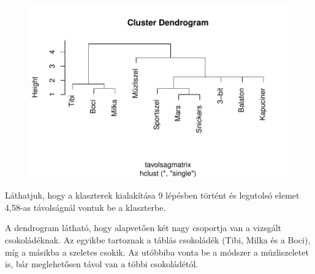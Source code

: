 \documentclass[
  letterpaper,
]{krantz}
\makeatletter
\newenvironment{Shaded}{\begin{snugshade}}{\end{snugshade}}
\newcommand{\CommentTok}[1]{\textcolor[rgb]{0.37,0.37,0.37}{#1}}
\newcommand{\NormalTok}[1]{\textcolor[rgb]{0.00,0.23,0.31}{#1}}
\newcommand{\SpecialCharTok}[1]{\textcolor[rgb]{0.37,0.37,0.37}{#1}}
\newenvironment{kframe}{%
\medskip{}
\setlength{\fboxsep}{.8em}
 \def\at@end@of@kframe{}%
 \ifinner\ifhmode%
  \def\at@end@of@kframe{\end{minipage}}%
  \begin{minipage}{\columnwidth}%
 \fi\fi%
 \def\FrameCommand##1{\hskip\@totalleftmargin \hskip-\fboxsep
 \colorbox{shadecolor}{##1}\hskip-\fboxsep
     \hskip-\linewidth \hskip-\@totalleftmargin \hskip\columnwidth}%
 \MakeFramed {\advance\hsize-\width
   \@totalleftmargin\z@ \linewidth\hsize
   \@setminipage}}%
 {\par\unskip\endMakeFramed%
 \at@end@of@kframe}
\renewenvironment{Shaded}{\begin{kframe}}{\end{kframe}}
\makeatother
\begin{document}
\begin{figure}[H]

{\centering \includegraphics{./sec_klaszter_files/figure-pdf/unnamed-chunk-25-1.pdf}

}

\end{figure}

\begin{Shaded}
\end{Shaded}

Láthatjuk, hogy a klaszterek kialakítása 9 lépésben történt és legutolsó
elemet 4,58-as távolságnál vontuk be a klaszterbe.

A dendrogram látható, hogy alapvetően két nagy csoportja van a vizsgált
csokoládéknak. Az egyikbe tartoznak a táblás csokoládék (Tibi, Milka és
a Boci), míg a másikba a szeletes csokik. Az utóbbiba vonta be a módszer
a müzliszeletet is, bár meglehetősen távol van a többi csokoládétól.
\end{document}
